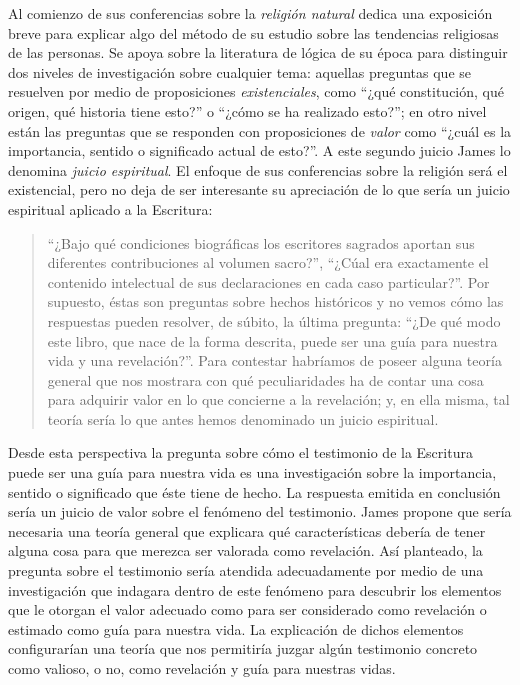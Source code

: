 Al comienzo de sus conferencias sobre la \emph{religión natural} dedica una
exposición breve para explicar algo del método de su estudio sobre las
tendencias religiosas de las personas. Se apoya sobre la literatura de lógica de
su época para distinguir dos niveles de investigación sobre cualquier tema:
aquellas preguntas que se resuelven por medio de proposiciones
\emph{existenciales}, como \enquote{¿qué constitución, qué origen, qué historia
  tiene esto?} o \enquote{¿cómo se ha realizado esto?}; en otro nivel están las
preguntas que se responden con proposiciones de \emph{valor} como \enquote{¿cuál
  es la importancia, sentido o significado actual de esto?}. A este segundo
juicio James lo denomina \emph{juicio espiritual}. El enfoque de sus
conferencias sobre la religión será el existencial, pero no deja de ser
interesante su apreciación de lo que sería un juicio espiritual aplicado a la
Escritura:

\blockquote[{\cite[27]{james2002variedades}}]{\enquote{¿Bajo qué condiciones
    biográficas los escritores sagrados aportan sus diferentes contribuciones al
    volumen sacro?}, \enquote{¿Cúal era exactamente el contenido intelectual de
    sus declaraciones en cada caso particular?}. Por supuesto, éstas son
  preguntas sobre hechos históricos y no vemos cómo las respuestas pueden
  resolver, de súbito, la última pregunta: \enquote{¿De qué modo este libro, que
    nace de la forma descrita, puede ser una guía para nuestra vida y una
    revelación?}. Para contestar habríamos de poseer alguna teoría general que
  nos mostrara con qué peculiaridades ha de contar una cosa para adquirir valor
  en lo que concierne a la revelación; y, en ella misma, tal teoría sería lo que
  antes hemos denominado un juicio espiritual.}

Desde esta perspectiva la pregunta sobre cómo el testimonio de la Escritura
puede ser una guía para nuestra vida es una investigación sobre la importancia,
sentido o significado que éste tiene de hecho. La respuesta emitida en
conclusión sería un juicio de valor sobre el fenómeno del testimonio. James
propone que sería necesaria una teoría general que explicara qué características
debería de tener alguna cosa para que merezca ser valorada como revelación. Así
planteado, la pregunta sobre el testimonio sería atendida adecuadamente por
medio de una investigación que indagara dentro de este fenómeno para descubrir
los elementos que le otorgan el valor adecuado como para ser considerado como
revelación o estimado como guía para nuestra vida. La explicación de dichos
elementos configurarían una teoría que nos permitiría juzgar algún testimonio
concreto como valioso, o no, como revelación y guía para nuestras vidas.

